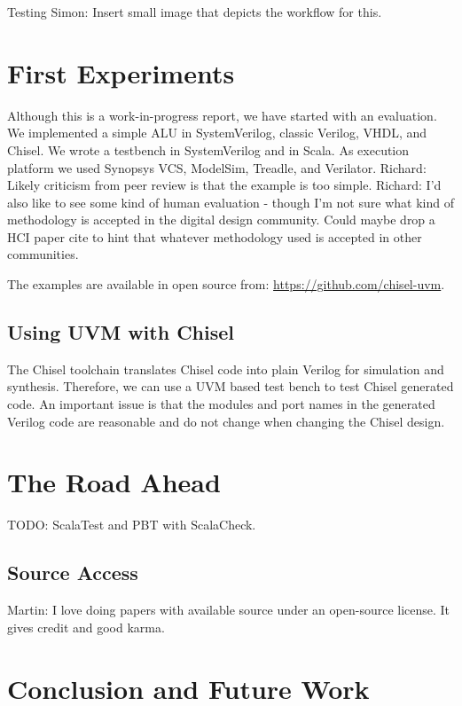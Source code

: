 \documentclass[a4paper, conference]{IEEEtran}
\newcommand{\todo}[1]{{\color{olive} TODO: #1}}
\newcommand{\martin}[1]{{\color{blue} Martin: #1}}
\newcommand{\simon}[1]{{\color{green} Simon: #1}}
\newcommand{\ducky}[1]{{\color{orange} Richard: #1}}
\begin{document}
Testing
\simon{Insert small image that depicts the workflow for this.}

\section{First Experiments}

Although this is a work-in-progress report, we have started with an evaluation.
We implemented a simple ALU in SystemVerilog, classic Verilog, VHDL, and Chisel.
We wrote a testbench in SystemVerilog and in Scala. As execution platform we
used Synopsys VCS, ModelSim, Treadle, and Verilator.
\ducky{Likely criticism from peer review is that the example is too simple.}
\ducky{I'd also like to see some kind of human evaluation - though I'm not sure what kind of methodology is accepted in the digital design community. Could maybe drop a HCI paper cite to hint that whatever methodology used is accepted in other communities.}

The examples are available in open source from: \url{https://github.com/chisel-uvm}.

\subsection{Using UVM with Chisel}

The Chisel toolchain translates Chisel code into plain Verilog for simulation and
synthesis. Therefore, we can use a UVM based test bench to test Chisel generated code.
An important issue is that the modules and port names in the generated Verilog
code are reasonable and do not change when changing the Chisel design.


\section{The Road Ahead}

\todo{ScalaTest and PBT with ScalaCheck.}




\subsection{Source Access}

\martin{I love doing papers with available source under an
open-source license. It gives credit and good karma.}


\section{Conclusion and Future Work}
\end{document}
